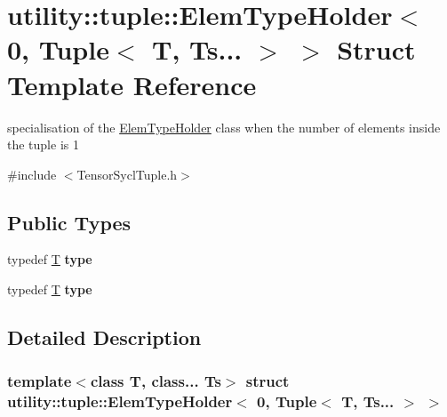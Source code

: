 \hypertarget{structutility_1_1tuple_1_1_elem_type_holder_3_010_00_01_tuple_3_01_t_00_01_ts_8_8_8_01_4_01_4}{}\section{utility\+:\+:tuple\+:\+:Elem\+Type\+Holder$<$ 0, Tuple$<$ T, Ts... $>$ $>$ Struct Template Reference}
\label{structutility_1_1tuple_1_1_elem_type_holder_3_010_00_01_tuple_3_01_t_00_01_ts_8_8_8_01_4_01_4}


specialisation of the \hyperlink{structutility_1_1tuple_1_1_elem_type_holder}{Elem\+Type\+Holder} class when the number of elements inside the tuple is 1  




{\ttfamily \#include $<$Tensor\+Sycl\+Tuple.\+h$>$}

\subsection*{Public Types}
\begin{DoxyCompactItemize}
\item 
\mbox{\label{structutility_1_1tuple_1_1_elem_type_holder_3_010_00_01_tuple_3_01_t_00_01_ts_8_8_8_01_4_01_4_a5872d6489942418613d72868769d0342}} 
typedef \hyperlink{group___sparse_core___module}{T} {\bfseries type}
\item 
\mbox{\label{structutility_1_1tuple_1_1_elem_type_holder_3_010_00_01_tuple_3_01_t_00_01_ts_8_8_8_01_4_01_4_a5872d6489942418613d72868769d0342}} 
typedef \hyperlink{group___sparse_core___module}{T} {\bfseries type}
\end{DoxyCompactItemize}


\subsection{Detailed Description}
\subsubsection*{template$<$class T, class... Ts$>$\newline
struct utility\+::tuple\+::\+Elem\+Type\+Holder$<$ 0, Tuple$<$ T, Ts... $>$ $>$}

